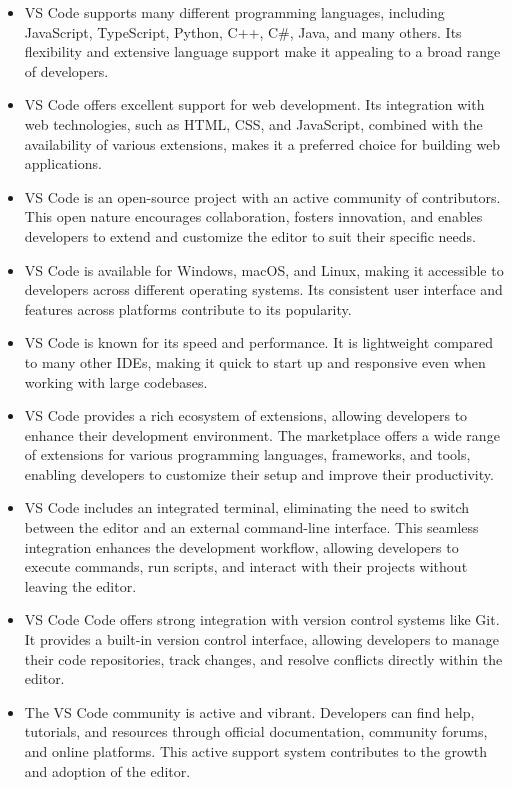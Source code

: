 \begin{itemize}
  \item \ac{VS Code} supports many different programming languages, including JavaScript, TypeScript, Python, C++, C\#, Java, and many others. Its flexibility and extensive language support make it appealing to a broad range of developers.
  \item \ac{VS Code} offers excellent support for web development. Its integration with web technologies, such as HTML, CSS, and JavaScript, combined with the availability of various extensions, makes it a preferred choice for building web applications.
  \item \ac{VS Code} is an open-source project with an active community of contributors. This open nature encourages collaboration, fosters innovation, and enables developers to extend and customize the editor to suit their specific needs.
  \item \ac{VS Code} is available for Windows, macOS, and Linux, making it accessible to developers across different operating systems. Its consistent user interface and features across platforms contribute to its popularity.
  \item \ac{VS Code} is known for its speed and performance. It is lightweight compared to many other \acp{IDE}, making it quick to start up and responsive even when working with large codebases.
  \item \ac{VS Code} provides a rich ecosystem of extensions, allowing developers to enhance their development environment. The marketplace offers a wide range of extensions for various programming languages, frameworks, and tools, enabling developers to customize their setup and improve their productivity.
  \item \ac{VS Code} includes an integrated terminal, eliminating the need to switch between the editor and an external command-line interface. This seamless integration enhances the development workflow, allowing developers to execute commands, run scripts, and interact with their projects without leaving the editor.
  \item \ac{VS Code} Code offers strong integration with version control systems like Git. It provides a built-in version control interface, allowing developers to manage their code repositories, track changes, and resolve conflicts directly within the editor.
  \item The \ac{VS Code} community is active and vibrant. Developers can find help, tutorials, and resources through official documentation, community forums, and online platforms. This active support system contributes to the growth and adoption of the editor.

\end{itemize}
